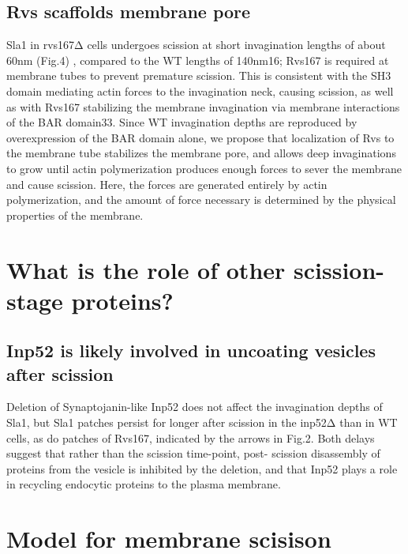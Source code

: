 \subsection{Rvs scaffolds membrane pore}
Sla1 in rvs167Δ cells undergoes scission at short invagination lengths of about 60nm (Fig.4) , compared to the WT lengths of 140nm16; Rvs167 is required at membrane tubes to prevent premature scission. This is consistent with the SH3 domain mediating actin forces to the invagination neck, causing scission, as well as with Rvs167 stabilizing the membrane invagination via membrane interactions of the BAR domain33. Since WT invagination depths are reproduced by overexpression of the BAR domain alone, we propose that localization of Rvs to the membrane tube stabilizes the membrane pore, and allows deep invaginations to grow until actin polymerization produces enough forces to sever the membrane and cause scission. Here, the forces are generated entirely by actin polymerization, and the amount of force necessary is determined by the physical properties of the membrane.

\section{What is the role of other scission-stage proteins?}
\subsection{Inp52 is likely involved in uncoating vesicles after scission}
Deletion of Synaptojanin-like Inp52 does not affect the invagination depths of Sla1, but Sla1 patches persist for longer after scission in the inp52Δ than in WT cells, as do patches of Rvs167, indicated by the arrows in Fig.2. Both delays suggest that rather than the scission time-point, post- scission disassembly of proteins from the vesicle is inhibited by the deletion, and that Inp52 plays a role in recycling endocytic proteins to the plasma membrane.


\section{Model for membrane scisison}



